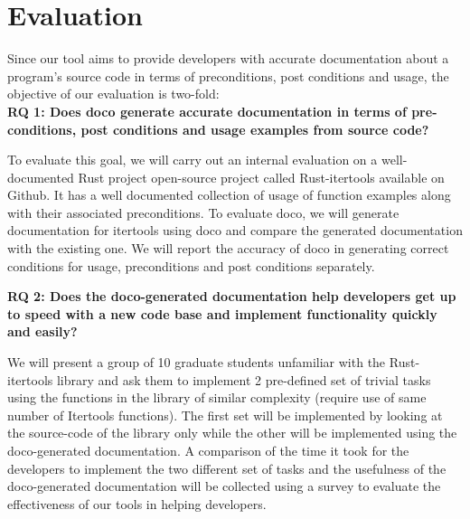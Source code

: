 \section{Evaluation}

Since our tool aims to provide developers with accurate documentation about a program's source code in terms of preconditions, post conditions and usage, the objective of our evaluation is two-fold:\\
\newline
{\bf RQ 1: Does doco generate accurate documentation in terms of pre-conditions, post conditions and usage examples from source code?}

To evaluate this goal, we will carry out an internal evaluation on a well-documented Rust project open-source project called Rust-itertools available on Github.\cite{bluss:2018} It has a well documented collection of usage of function examples along with their associated preconditions. To evaluate doco, we will generate documentation for itertools using doco and compare the generated documentation with the existing one. We will report the accuracy of doco in generating correct conditions for usage, preconditions and post conditions separately.\newline

{\bf RQ 2: Does the doco-generated documentation help developers get up to speed with a new code base and implement functionality quickly and easily?}

We will present a group of 10 graduate students unfamiliar with the Rust-itertools library and ask them to implement 2 pre-defined set of trivial tasks using the functions in the library of similar complexity (require use of same number of Itertools functions). The first set will be implemented by looking at the source-code of the library only while the other will be implemented using the doco-generated documentation. A comparison of the time it took for the developers to implement the two different set of tasks and the usefulness of the doco-generated documentation will be collected using a survey to evaluate the effectiveness of our tools in helping developers.
